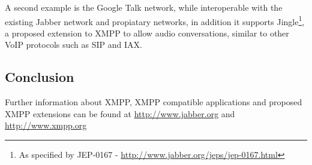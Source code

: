 A second example is the Google Talk network, while interoperable with
the existing Jabber network and propiatary networks, in addition it
supports Jingle\footnote{As specified by JEP-0167 - \url{http://www.jabber.org/jeps/jep-0167.html}},
a proposed extension to XMPP to allow audio conversations, similar to
other VoIP protocols such as SIP and IAX.

\subsection{Conclusion}

Further information about XMPP, XMPP compatible applications and
proposed XMPP extensions can be found at \url{http://www.jabber.org} and
\url{http://www.xmpp.org}
